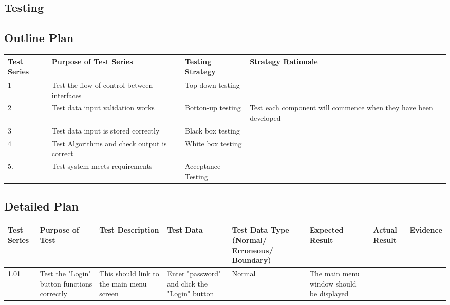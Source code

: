 \begin{landscape}

\section{Testing}

\subsection{Outline Plan}

\begin{center}
    \begin{tabular}{|p{3cm}|p{3.5cm}|p{4cm}|p{6cm}|}
        \hline
        \textbf{Test Series} & \textbf{Purpose of Test Series} & \textbf{Testing Strategy} & \textbf{Strategy Rationale}\\ \hline
        1 & Test the flow of control between interfaces      & Top-down testing     & \\ \hline
        2 & Test data input validation works                 & Botton-up testing    & Test each component will commence when they have been developed\\ \hline
        3 & Test data input is stored correctly              & Black box testing    & \\ \hline
        4 & Test Algorithms and check output is correct      & White box testing    & \\ \hline
        5.& Test system meets requirements                   & Acceptance Testing   & \\ \hline
    \end{tabular}
\end{center}

\newpage

\subsection{Detailed Plan}

\begin{center}
    \begin{longtable}{|p{1.5cm}|p{2cm}|p{3cm}|p{2cm}|p{2cm}|p{2.5cm}|p{2cm}|p{2cm}|}
        \hline
        \textbf{Test Series} & \textbf{Purpose of Test} & \textbf{Test Description} & \textbf{Test Data} & \textbf{Test Data Type (Normal/ Erroneous/ Boundary)} & \textbf{Expected Result} & \textbf{Actual Result} & \textbf{Evidence}\\ \hline
        
        1.01 & Test the "Login" button functions correctly & This should link to the main menu screen & Enter "password" and click the "Login" button & Normal & The 
        main menu window should be displayed  & & \\ \hline
        

\end{longtable}
\end{center}
\end{landscape}
